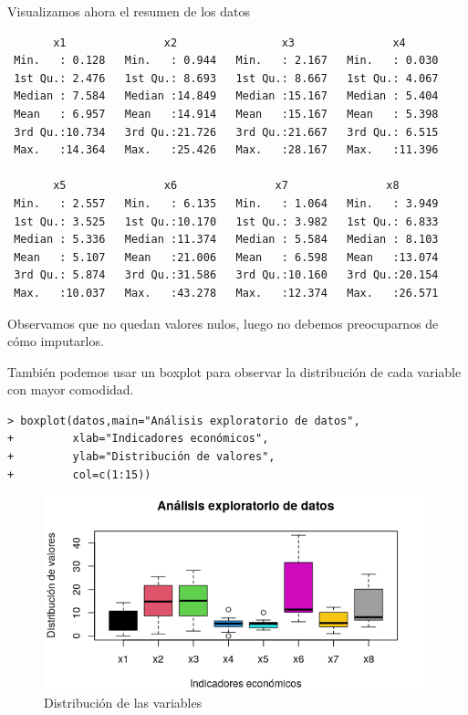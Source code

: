 \documentclass[12pt]{article}
\begin{document}
Visualizamos ahora el resumen de los datos
\begin{verbatim}
       x1               x2                x3               x4         
 Min.   : 0.128   Min.   : 0.944   Min.   : 2.167   Min.   : 0.030  
 1st Qu.: 2.476   1st Qu.: 8.693   1st Qu.: 8.667   1st Qu.: 4.067  
 Median : 7.584   Median :14.849   Median :15.167   Median : 5.404  
 Mean   : 6.957   Mean   :14.914   Mean   :15.167   Mean   : 5.398  
 3rd Qu.:10.734   3rd Qu.:21.726   3rd Qu.:21.667   3rd Qu.: 6.515  
 Max.   :14.364   Max.   :25.426   Max.   :28.167   Max.   :11.396 
 
       x5               x6               x7               x8        
 Min.   : 2.557   Min.   : 6.135   Min.   : 1.064   Min.   : 3.949  
 1st Qu.: 3.525   1st Qu.:10.170   1st Qu.: 3.982   1st Qu.: 6.833  
 Median : 5.336   Median :11.374   Median : 5.584   Median : 8.103  
 Mean   : 5.107   Mean   :21.006   Mean   : 6.598   Mean   :13.074  
 3rd Qu.: 5.874   3rd Qu.:31.586   3rd Qu.:10.160   3rd Qu.:20.154  
 Max.   :10.037   Max.   :43.278   Max.   :12.374   Max.   :26.571
\end{verbatim}

Observamos que no quedan valores nulos, luego no debemos preocuparnos de
cómo imputarlos.

También podemos usar un boxplot para observar la distribución de cada variable con mayor comodidad.
\begin{verbatim}
> boxplot(datos,main="Análisis exploratorio de datos",
+         xlab="Indicadores económicos",
+         ylab="Distribución de valores",
+         col=c(1:15))
\end{verbatim}
\vspace{-3mm}
\begin{figure}[H]
  \centering
  \includegraphics[width=110mm]{imgs/boxplot-analisis}
  \caption{Distribución de las variables}
  \label{fig:boxplot-analisis}
\end{figure}
\end{document}
